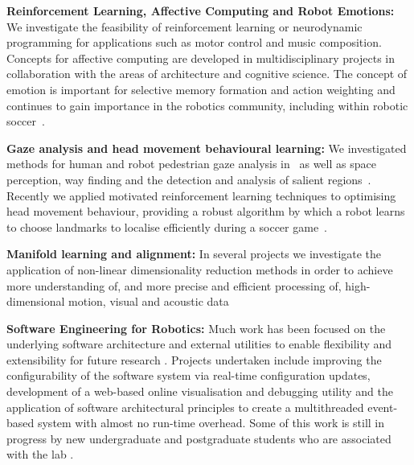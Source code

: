 \documentclass{llncs}
\begin{document}
\noindent\textbf{Reinforcement Learning, Affective Computing and Robot Emotions:} We investigate the feasibility of reinforcement learning or neurodynamic programming for applications such as motor control and music composition. Concepts for affective computing are developed in multidisciplinary projects in collaboration with the areas of architecture and cognitive science. The concept of emotion is important for selective memory formation and action weighting and continues to gain importance in the robotics community, including within robotic soccer~\cite{HongEtAl2014,FountainEtAl2014,ChalupOstwald2009,WalkerChalup2015,WongEtAl2012,WongEtAl2013}.

\noindent\textbf{Gaze analysis and head movement behavioural learning:} We investigated methods for human and robot pedestrian gaze analysis in~\cite{JalalianEtAl_CAADRIA2011,WongEtAl2012} as well as space perception, way finding and the detection and analysis of salient regions~\cite{BhatiaEtAl2013,BhatiaChalupOstwald2013}. Recently we applied motivated reinforcement learning techniques to optimising head movement behaviour, providing a robust algorithm by which a robot learns to choose landmarks to localise efficiently during a soccer game~\cite{FountainEtAl2014}. 

\noindent\textbf{Manifold learning and alignment:} In several projects we
investigate the application of non-linear dimensionality reduction
methods in order to achieve more understanding of, and more precise
and efficient processing of, high-dimensional motion, visual and acoustic data \cite{ChalupEtAl2007b,WongEtAl2012,WongChalup2008,AzizEtAl2015}

\noindent\textbf{Software Engineering for Robotics:} Much work has been focused on the underlying software architecture and external utilities to enable flexibility and extensibility for future research \cite{Kulk2011c,HoulistonEtAl2016}. Projects undertaken include improving the configurability of the software system via real-time configuration updates, development of a web-based online visualisation and debugging utility \cite{AnnableEtAl2014} and the application of software architectural principles to create a multithreaded event-based system with almost no run-time overhead. Some of this work is still in progress by new undergraduate and postgraduate students who are associated with the lab \cite{BilleEtAl2016}.

\end{document}

